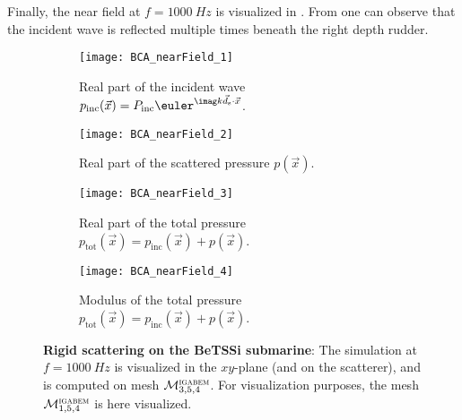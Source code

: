 Finally, the near field at $f=\SI{1000}{Hz}$ is visualized in . From  one can observe that the incident wave is reflected multiple times beneath the right depth rudder.
\begin{figure}
	\centering    
	\begin{subfigure}[b]{\textwidth}
		\centering
		\texttt{[image: BCA\_nearField\_1]}
		\caption{Real part of the incident wave $p_{\mathrm{inc}}(\vec{x})=P_{\mathrm{inc}}\euler^{\imag k\vec{d}_{\mathrm{s}}\cdot \vec{x}}$.}
	\end{subfigure}
	\par\smallskip
	\begin{subfigure}[b]{\textwidth}
		\centering
		\texttt{[image: BCA\_nearField\_2]}
		\caption{Real part of the scattered pressure $p(\vec{x})$.}
	\end{subfigure}
	\par\smallskip
	\begin{subfigure}[b]{\textwidth}
		\centering
		\texttt{[image: BCA\_nearField\_3]}
		\caption{Real part of the total pressure $p_{\mathrm{tot}}(\vec{x})=p_{\mathrm{inc}}(\vec{x})+p(\vec{x})$.}
	\end{subfigure}
	\par\smallskip
	\begin{subfigure}[b]{\textwidth}
		\centering
		\texttt{[image: BCA\_nearField\_4]}
		\caption{Modulus of the total pressure $p_{\mathrm{tot}}(\vec{x})=p_{\mathrm{inc}}(\vec{x})+p(\vec{x})$.}
		\label{Fig3:BC_NearField_abs}
	\end{subfigure}
	\caption{\textbf{Rigid scattering on the BeTSSi submarine}: The simulation at $f=\SI{1000}{Hz}$ is visualized in the $xy$-plane (and on the scatterer), and is computed on mesh ${\cal M}_{3,5,4}^{\textsc{igabem}}$. For visualization purposes, the mesh ${\cal M}_{1,5,4}^{\textsc{igabem}}$ is here visualized.}
	\label{Fig3:BC_NearField}
\end{figure}
